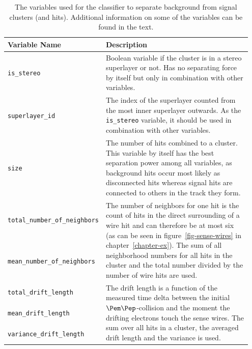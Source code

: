 \begin{table}
  \centering
  \caption{The variables used for the classifier to separate background from signal clusters (and hits). Additional information on some of the variables can be found in the text.}
  
  \begin{tabular}{p{0.35\linewidth}p{0.60\linewidth}} \toprule
   Variable Name & Description \\ \midrule
   \verb+is_stereo+ & Boolean variable if the cluster is in a stereo superlayer or not. Has no separating force by itself but only in combination with other variables. \\ \midrule 
   \verb+superlayer_id+ & The index of the superlayer counted from the most inner superlayer outwards. As the \verb+is_stereo+ variable, it should be used in combination with other variables.\\ \midrule 
   
   \verb+size+ & The number of hits combined to a cluster. This variable by itself has the best separation power among all variables, as background hits occur most likely as disconnected hits whereas signal hits are connected to others in the track they form.  \\ \midrule 
   
   \verb+total_number_of_neighbors+ & \multirow{2}{*}[-1.5pt]{\begin{minipage}{\linewidth} The number of neighbors for one hit is the count of hits in the direct surrounding of a wire hit and can therefore be at most six (as can be seen in figure~\ref{fig-sense-wires} in chapter~\ref{chapter-ex}). The sum of all neighborhood numbers for all hits in the cluster and the total number divided by the number of wire hits are used. \end{minipage}} \\[5ex] \cmidrule{1-1}
   \verb+mean_number_of_neighbors+ & \\[5ex] \midrule 
   
   \verb+total_drift_length+ & \multirow{3}{*}[-1.5pt]{\begin{minipage}{\linewidth} The drift length is a function of the measured time delta between the initial $\Pem\Pep$-collision and the moment the drifting electrons touch the sense wires. The sum over all hits in a cluster, the averaged drift length and the variance is used. \end{minipage}} \\[1ex] \cmidrule{1-1}
   \verb+mean_drift_length+ & \\[1ex] \cmidrule{1-1}
   \verb+variance_drift_length+ & \\[1ex] \midrule 
   

\end{tabular}
\end{table}
